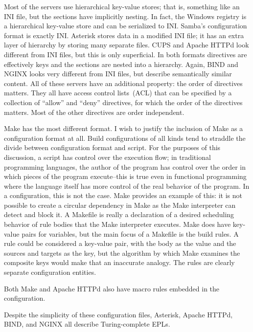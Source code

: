 \documentclass[letterpaper,twocolumn,10pt]{article}
\begin{document}
Most of the servers use hierarchical key-value stores; that is, something like an INI file, but the sections have implicitly nesting. In fact, the Windows registry is a hierarchical key-value store and can be serialized to INI. Samba's configuration format is exactly INI.\cite{samba} Asterisk stores data in a modified INI file; it has an extra layer of hierarchy by storing many separate files.\cite{asterisk} CUPS and Apache HTTPd look different from INI files, but this is only superficial. In both formats directives are effectively keys and the sections are nested into a hierarchy.\cite{cups,apache} Again, BIND and NGINX looks very different from INI files, but describe semantically similar content.\cite{bind,nginx} All of these servers have an additional property: the order of directives matters. They all have access control lists~(ACL) that can be specified by a collection of ``allow'' and ``deny'' directives, for which the order of the directives matters. Most of the other directives are order independent.

Make has the most different format. I wish to justify the inclusion of Make as a configuration format at all. Build configurations of all kinds tend to straddle the divide between configuration format and script. For the purposes of this discussion, a script has control over the execution flow; in traditional programming languages, the author of the program has control over the order in which pieces of the program execute--this is true even in functional programming where the language itself has more control of the real behavior of the program. In a configuration, this is not the case. Make provides an example of this: it is not possible to create a circular dependency in Make as the Make interpreter can detect and block it. A Makefile is really a declaration of a desired scheduling behavior of rule bodies that the Make interpreter executes. Make does have key-value pairs for variables, but the main focus of a Makefile is the build rules. A rule could be considered a key-value pair, with the body as the value and the sources and targets as the key, but the algorithm by which Make examines the composite keys would make that an inaccurate analogy. The rules are clearly separate configuration entities.

Both Make and Apache HTTPd also have macro rules embedded in the configuration.

Despite the simplicity of these configuration files, Asterisk, Apache HTTPd, BIND, and NGINX all describe Turing-complete EPLs.
\end{document}

